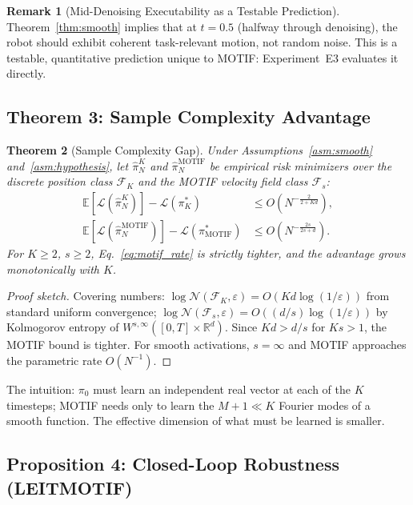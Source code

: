 \documentclass[11pt]{article}
\theoremstyle{plain}
\newtheorem{theorem}{Theorem}[section]
\theoremstyle{definition}
\newtheorem{remark}[theorem]{Remark}
\newcommand{\R}{\mathbb{R}}
\newcommand{\E}{\mathbb{E}}
\newcommand{\tdiff}{t}
\begin{document}
\begin{remark}[Mid-Denoising Executability as a Testable Prediction]
Theorem~\ref{thm:smooth} implies that at $\tdiff = 0.5$ (halfway through
denoising), the robot should exhibit coherent task-relevant motion, not
random noise.
This is a testable, quantitative prediction unique to MOTIF:
Experiment~E3 evaluates it directly.
\end{remark}

\subsection{Theorem 3: Sample Complexity Advantage}

\begin{theorem}[Sample Complexity Gap]
\label{thm:sample}
Under Assumptions~\ref{asm:smooth} and~\ref{asm:hypothesis}, let
$\hat{\pi}_N^{K}$ and $\hat{\pi}_N^{\mathrm{MOTIF}}$ be empirical risk
minimizers over the discrete position class $\mathcal{F}_K$ and the MOTIF
velocity field class $\mathcal{F}_s$:
\begin{align}
  \E[\mathcal{L}(\hat{\pi}_N^K)] - \mathcal{L}(\pi^*_K)
    &\leq O\!\left(N^{-\frac{2}{2+Kd}}\right), \label{eq:pi0_rate}\\
  \E[\mathcal{L}(\hat{\pi}_N^{\mathrm{MOTIF}})] - \mathcal{L}(\pi^*_{\mathrm{MOTIF}})
    &\leq O\!\left(N^{-\frac{2s}{2s+d}}\right). \label{eq:motif_rate}
\end{align}
For $K \geq 2$, $s \geq 2$, Eq.~\eqref{eq:motif_rate} is strictly tighter,
and the advantage grows monotonically with $K$.
\end{theorem}

\begin{proof}[Proof sketch]
Covering numbers: $\log \mathcal{N}(\mathcal{F}_K, \varepsilon) = O(Kd \log(1/\varepsilon))$
from standard uniform convergence;
$\log \mathcal{N}(\mathcal{F}_s, \varepsilon) = O((d/s)\log(1/\varepsilon))$
by Kolmogorov entropy of $W^{s,\infty}([0,T]\times\R^d)$.
Since $Kd > d/s$ for $Ks > 1$, the MOTIF bound is tighter.
For smooth activations, $s = \infty$ and MOTIF approaches the parametric
rate $O(N^{-1})$.
\end{proof}

The intuition: $\pi_0$ must learn an independent real vector at each of
the $K$ timesteps; MOTIF needs only to learn the $M+1 \ll K$ Fourier
modes of a smooth function.
The effective dimension of what must be learned is smaller.

\subsection{Proposition 4: Closed-Loop Robustness (LEITMOTIF)}
\end{document}
